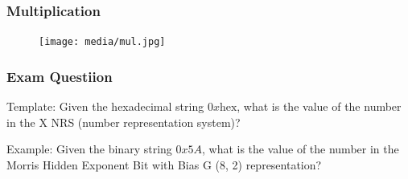 \begin{frame}
    \frametitle{Multiplication}
    \begin{figure}[tp]
    \texttt{[image: media/mul.jpg]}
    \end{figure}
\end{frame}

\begin{frame}
    \frametitle{Exam Questiion}
    Template: Given the hexadecimal string $0x\text{hex}$, what is the value of the number in the X NRS (number representation system)?
    
    Example: Given the binary string $0x5A$, what is the value of the number in the Morris Hidden Exponent Bit with Bias G (8, 2) representation?
\end{frame}